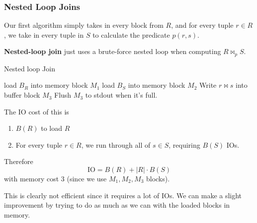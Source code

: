 \documentclass{article}
\begin{document}
    \subsubsection{Nested Loop Joins} 

      Our first algorithm simply takes in every block from $R$, and for every tuple $r \in R$, we take in every tuple in $S$ to calculate the predicate $p(r, s)$. 

      \begin{algo}
        \textbf{Nested-loop join} just uses a brute-force nested loop when computing $R \bowtie_p S$. 
        \begin{algorithm}[H]
          \caption{Nested loop Join}
          \begin{algorithmic}
                \State load $B_R$ into memory block $M_1$
                    \State load $B_S$ into memory block $M_2$
                        \State Write $r \bowtie s$ into buffer block $M_3$ 
                        \State Flush $M_3$ to stdout when it's full. 
                      \EndIf
                    \EndFor
                  \EndFor
                \EndFor
              \EndFor
            \EndFunction
          \end{algorithmic}
        \end{algorithm} 
        The IO cost of this is 
        \begin{enumerate}
          \item $B(R)$ to load $R$ 
          \item For every tuple $r \in R$, we run through all of $s \in S$, requiring $B(S)$ IOs.
        \end{enumerate} 
        Therefore
        \begin{equation}
          \mathrm{IO} = B(R) + |R| \cdot B(S)
        \end{equation}
        with memory cost $3$ (since we use $M_1, M_2, M_3$ blocks).
      \end{algo}

      This is clearly not efficient since it requires a lot of IOs. We can make a slight improvement by trying to do as much as we can with the loaded blocks in memory. 
\end{document}
